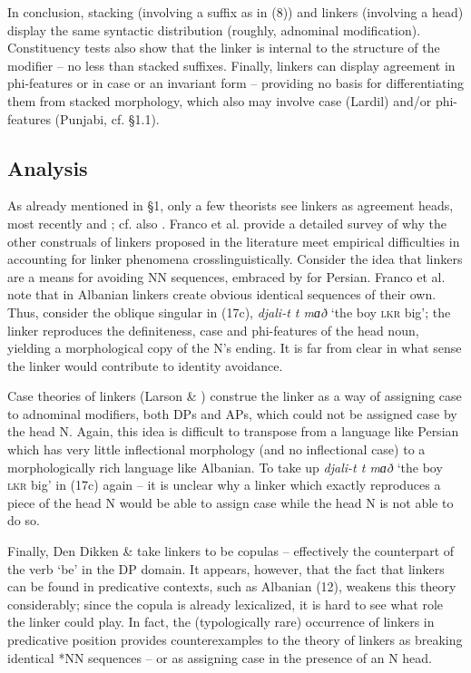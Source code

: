 \documentclass[output=paper]{langsci/langscibook}
\begin{document}
In conclusion, stacking (involving a suffix as in (8)) and linkers (involving a head) display the same syntactic distribution (roughly, adnominal modification). Constituency tests also show that the linker is internal to the structure of the modifier – no less than stacked suffixes. Finally, linkers can display agreement in phi-features or in case or an invariant form – providing no basis for differentiating them from stacked morphology, which also may involve case (Lardil) and/or phi-features (Punjabi, cf. §1.1).

\subsection{Analysis}

As already mentioned in §1, only a few theorists see linkers as agreement heads, most recently \citet{Philip2012} and \citet{FrancoEtAl2015}; cf. also \citet{Zwart2006}. Franco et al. provide a detailed survey of why the other construals of linkers proposed in the literature meet empirical difficulties in accounting for linker phenomena crosslinguistically. Consider the idea that linkers are a means for avoiding NN sequences, embraced by \citet{Richards2010} for Persian. Franco et al. note that in Albanian linkers create obvious identical sequences of their own. Thus, consider the oblique singular in (17c), \textit{djali-t t mɑð} ‘the boy \textsc{lkr} big’; the linker reproduces the definiteness, case and phi-features of the head noun, yielding a morphological copy of the N’s ending. It is far from clear in what sense the linker would contribute to identity avoidance.

  Case theories of linkers (Larson \& \citealt{Yamakido2008}) construe the linker as a way of assigning case to adnominal modifiers, both DPs and APs, which could not be assigned case by the head N. Again, this idea is difficult to transpose from a language like Persian which has very little inflectional morphology (and no inflectional case) to a morphologically rich language like Albanian. To take up \textit{djali-t t mɑð} ‘the boy \textsc{lkr} big’ in (17c) again – it is unclear why a linker which exactly reproduces a piece of the head N would be able to assign case while the head N is not able to do so.    

  Finally, Den Dikken \& \citet{Singhapreecha2004} take linkers to be copulas – effectively the counterpart of the verb ‘be’ in the DP domain. It appears, however, that the fact that linkers can be found in predicative contexts, such as Albanian (12), weakens this theory considerably; since the copula is already lexicalized, it is hard to see what role the linker could play. In fact, the (typologically rare) occurrence of linkers in predicative position provides counterexamples to the theory of linkers as breaking identical *NN sequences – or as assigning case in the presence of an N head. 
\end{document}

